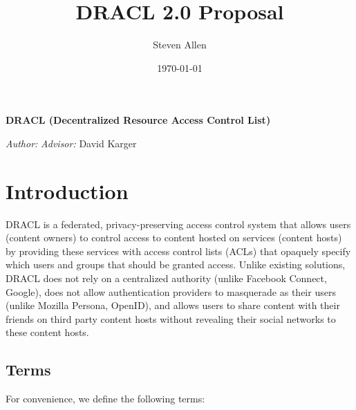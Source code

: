 \documentclass[pdftex,12pt,a4papaer]{report}
\title{DRACL 2.0 Proposal}
\author{Steven Allen}
\date{\today}
\begin{document}
\thispagestyle{plain}

\begin{center}
    \vspace*{\fill}
    {%
        \onehalfspacing{} \bfseries \Large
        DRACL (Decentralized Resource Access Control List) \\
    }

    \vspace{\fill}
    {\large
    \begin{minipage}{0.9\textwidth}
        \emph{Author:} \theauthor{} \hfill \emph{Advisor:} David Karger
        \\
        \begin{center}
              \thedate{}
        \end{center}
    \end{minipage}
    }
    \vspace*{\fill}
\end{center}

\tableofcontents

\newpage

\chapter{Introduction} 

DRACL is a federated, privacy-preserving access control system that allows users
(content owners) to control access to content hosted on services (content hosts)
by providing these services with access control lists (ACLs) that opaquely
specify which users and groups that should be granted access. Unlike existing
solutions, DRACL does not rely on a centralized authority (unlike Facebook
Connect, Google), does not allow authentication providers to masquerade as their
users (unlike Mozilla Persona, OpenID), and allows users to share content with
their friends on third party content hosts without revealing their social
networks to these content hosts.

\section{Terms}

For convenience, we define the following terms:
\end{document}
